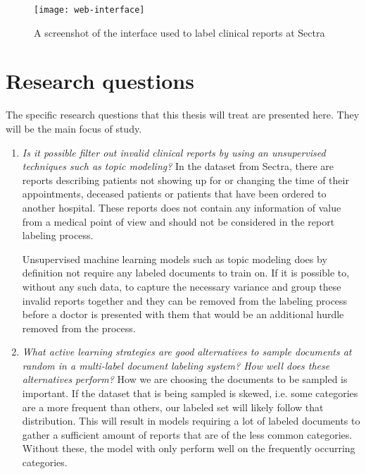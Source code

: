 \begin{figure}
      \centering
      \texttt{[image: web-interface]}
      \caption{A screenshot of the interface used to label clinical reports at Sectra}
      \label{web-interface}
\end{figure}

\section{Research questions}
\label{sec:research-questions}

The specific research questions that this thesis will treat are presented here.
They will be the main focus of study.

\begin{enumerate}

\item \textit{Is it possible filter out invalid clinical reports by using an unsupervised techniques such as topic modeling?}
      \newline
      In the dataset from Sectra, there are reports describing patients not showing up for or changing the time of their appointments, deceased patients or patients that have been ordered to another hospital.
      These reports does not contain any information of value from a medical point of view and should not be considered in the report labeling process.

      Unsupervised machine learning models such as topic modeling does by definition not require any labeled documents to train on.
      If it is possible to, without any such data, to capture the necessary variance and group these invalid reports together and they can be removed from the labeling process before a doctor is presented with them that would be an additional hurdle removed from the process.

\item \label{intro:re-q2} 
      \textit{What active learning strategies are good alternatives to sample documents at random in a multi-label document labeling system? How well does these alternatives perform?}
      \newline
      How we are choosing the documents to be sampled is important.
      If the dataset that is being sampled is skewed, i.e. some categories are a more frequent than others, our labeled set will likely follow that distribution.
      This will result in models requiring a lot of labeled documents to gather a sufficient amount of reports that are of the less common categories.
      Without these, the model with only perform well on the frequently occurring categories.


\end{enumerate}
